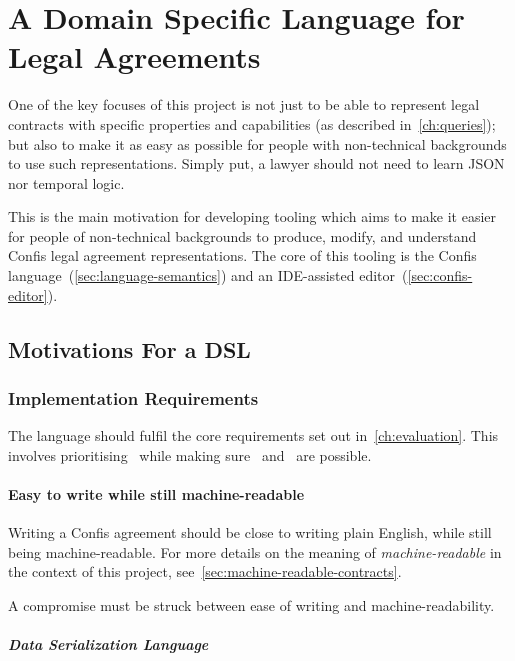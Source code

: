 \chapter{A Domain Specific Language for Legal Agreements}\label{ch:lang}

One of the key focuses of this project is not just to be able to represent legal contracts with specific properties and capabilities (as described in~\autoref{ch:queries});
but also to make it as easy as possible for people with non-technical backgrounds to use such representations.
Simply put, a lawyer should not need to learn JSON nor temporal logic.

This is the main motivation for developing tooling which aims to make it easier for people of non-technical backgrounds to produce, modify, and understand Confis legal agreement representations.
The core of this tooling is the Confis language~(\autoref{sec:language-semantics}) and an IDE-assisted editor~(\autoref{sec:confis-editor}).


\section{Motivations For a DSL}\label{sec:dsl-motivations}

\subsection{Implementation Requirements}\label{subsec:dsl:requirements}

The language should fulfil the core requirements set out in~\autoref{ch:evaluation}.
This involves prioritising~ while making sure~ and~ are possible.

\subsubsection{Easy to write while still machine-readable}

Writing a Confis agreement should be close to writing plain English, while still being machine-readable.
For more details on the meaning of \emph{machine-readable} in the context of this project, see~\autoref{sec:machine-readable-contracts}.


A compromise must be struck between ease of writing and machine-readability.

\paragraph{Data Serialization Language}

